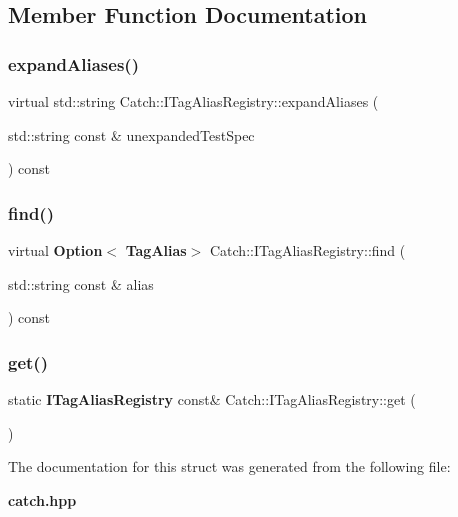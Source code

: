 \subsection{Member Function Documentation}
\mbox{\label{struct_catch_1_1_i_tag_alias_registry_ae729a7532faf7466db1a157ce0395170}} 
\subsubsection{expand\+Aliases()}
{\footnotesize\ttfamily virtual std\+::string Catch\+::\+I\+Tag\+Alias\+Registry\+::expand\+Aliases (\begin{DoxyParamCaption}\item[{std\+::string const \&}]{unexpanded\+Test\+Spec }\end{DoxyParamCaption}) const\hspace{0.3cm}{\ttfamily [pure virtual]}}

\mbox{\label{struct_catch_1_1_i_tag_alias_registry_a7d2fba4d39cfcc62c2695fcde4f989c3}} 
\subsubsection{find()}
{\footnotesize\ttfamily virtual \textbf{ Option}$<$\textbf{ Tag\+Alias}$>$ Catch\+::\+I\+Tag\+Alias\+Registry\+::find (\begin{DoxyParamCaption}\item[{std\+::string const \&}]{alias }\end{DoxyParamCaption}) const\hspace{0.3cm}{\ttfamily [pure virtual]}}

\mbox{\label{struct_catch_1_1_i_tag_alias_registry_aa9d0f008f49473389c7abf6071f137a7}} 
\subsubsection{get()}
{\footnotesize\ttfamily static \textbf{ I\+Tag\+Alias\+Registry} const\& Catch\+::\+I\+Tag\+Alias\+Registry\+::get (\begin{DoxyParamCaption}{ }\end{DoxyParamCaption})\hspace{0.3cm}{\ttfamily [static]}}



The documentation for this struct was generated from the following file\+:\begin{DoxyCompactItemize}
\item 
\textbf{ catch.\+hpp}\end{DoxyCompactItemize}
